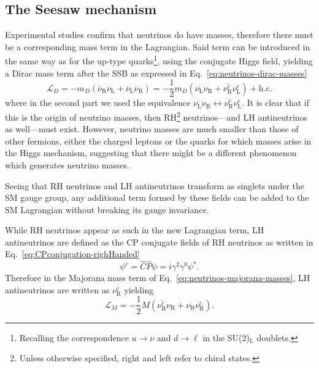 \subsection{The Seesaw mechanism}
\label{subsec:seesaw}
Experimental studies confirm that neutrinos do have masses, therefore there must be a corresponding mass term in the Lagrangian. 
Said term can be introduced in the same way as for the up-type quarks\footnote{Recalling the correspondence $u \rightarrow \nu$ and $d \rightarrow \ell$ in the SU(2)$_\text{L}$ doublets.}, using the conjugate Higgs field, yielding a Dirac mass term after the \ac{SSB} as expressed in Eq.~\ref{eq:neutrinos-dirac-masses}
\begin{equation}
    \label{eq:neutrinos-dirac-masses}
    \mathcal{L}_{D} = - m_D (\overline{\nu}_\text{R}\nu_\text{L} + \overline{\nu}_\text{L}\nu_\text{R}) = -\frac{1}{2}m_D (\overline{\nu_\text{L}}\nu_\text{R} + \overline{\nu_\text{R}^c}\nu_\text{L}^c) + \text{h.c.}
\end{equation}
where in the second part we used the equivalence $\overline{\nu_\text{L}}\nu_\text{R} \longleftrightarrow \overline{\nu_\text{R}^c}\nu_\text{L}^c $.
It is clear that if this is the origin of neutrino masses, then \ac{RH}\footnote{Unless otherwise specified, right and left refer to chiral states.}
neutrinos---and \ac{LH} antineutrinos as well---must exist. However, neutrino masses are much smaller than those of other fermions, either the charged leptons or the quarks for which masses arise in the Higgs mechanism, suggesting that there might be a different phenomenon which generates neutrino masses.

Seeing that \ac{RH} neutrinos and \ac{LH} antineutrinos transform as singlets under the \ac{SM} gauge group, any additional term formed by these fields can be added to the \ac{SM} Lagrangian without breaking its gauge invariance.

While \ac{RH} neutrinos appear as such in the new Lagrangian term, \ac{LH} antineutrinos are defined as the \ac{CP} conjugate fields of \ac{RH} neutrinos as written in Eq.~\ref{eq:CPconjugation-righHanded}
\begin{equation}
    \label{eq:CPconjugation-righHanded}
    \psi^c = \hat{C}\hat{P}\psi = i\gamma^2\gamma^0\psi^*.
\end{equation} 
Therefore in the Majorana mass term of Eq.~\ref{eq:neutrinos-majorana-masses}, \ac{LH} antineutrinos are written as $\nu_\text{R}^c$ yielding
\begin{equation}
    \label{eq:neutrinos-majorana-masses}
    \mathcal{L}_M = -\frac{1}{2} M \left( \overline{\nu_\text{R}^c} \nu_\text{R} + \overline{\nu_\text{R}} \nu_\text{R}^c \right).
\end{equation}
 

